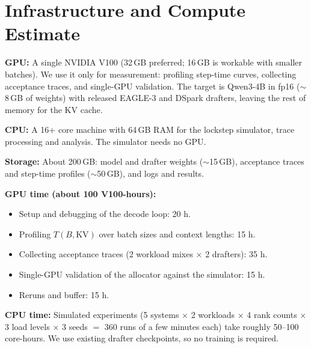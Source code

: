 \documentclass{article}
\begin{document}
\section{Infrastructure and Compute Estimate}
\label{sec:infra}

\textbf{GPU:} A single NVIDIA V100 (32\,GB preferred; 16\,GB is workable with
smaller batches). We use it only for measurement: profiling step-time curves,
collecting acceptance traces, and single-GPU validation. The target is
Qwen3-4B in fp16 ($\sim$8\,GB of weights) with released EAGLE-3 and DSpark
drafters, leaving the rest of memory for the KV cache.

\textbf{CPU:} A 16+ core machine with 64\,GB RAM for the lockstep simulator,
trace processing and analysis. The simulator needs no GPU.

\textbf{Storage:} About 200\,GB: model and drafter weights ($\sim$15\,GB),
acceptance traces and step-time profiles ($\sim$50\,GB), and logs and results.

\textbf{GPU time (about 100 V100-hours):}
\begin{itemize}
\item Setup and debugging of the decode loop: 20 h.
\item Profiling $T(B,\mathrm{KV})$ over batch sizes and context lengths: 15 h.
\item Collecting acceptance traces (2 workload mixes $\times$ 2 drafters): 35 h.
\item Single-GPU validation of the allocator against the simulator: 15 h.
\item Reruns and buffer: 15 h.
\end{itemize}

\textbf{CPU time:} Simulated experiments (5 systems $\times$ 2 workloads
$\times$ 4 rank counts $\times$ 3 load levels $\times$ 3 seeds $=$ 360 runs of a
few minutes each) take roughly 50--100 core-hours. We use existing drafter
checkpoints, so no training is required.



\end{document}
